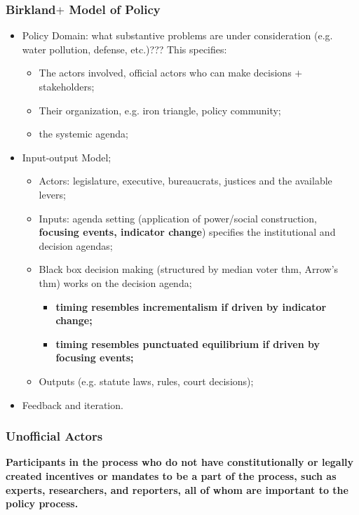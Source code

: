 \documentclass[aspectratio=169]{beamer}
\theoremstyle{principle}
\begin{document}
\begin{frame}
\frametitle{Birkland$+$ Model of Policy}
\begin{itemize}
\item Policy Domain: what substantive problems are under consideration (e.g. water pollution, defense, etc.)???  This specifies:
\begin{itemize}
\item The actors involved, official actors who can make decisions $+$ stakeholders; 
\item Their organization, e.g. iron triangle, policy community;
\item the systemic agenda; 
\end{itemize}
\bigskip
\item \color{black}Input-output Model;
\begin{itemize}
\item Actors: legislature, executive, bureaucrats, justices and the available levers;
\item Inputs: agenda setting (application of power/social construction, \textbf{focusing events, indicator change}) specifies the institutional and decision agendas;
\item Black box decision making (structured by median voter thm, Arrow's thm) works on the decision agenda;
\begin{itemize}
\item \textbf{timing resembles incrementalism if driven by indicator change;}
\item \textbf{timing resembles punctuated equilibrium if driven by focusing events;}
 \end{itemize}
\item Outputs (e.g. statute laws, rules, court decisions);
\end{itemize}
\bigskip
\item Feedback and iteration.
\end{itemize}
\end{frame}

\begin{frame}
\frametitle{Unofficial Actors}
\begin{center}
\Large \textbf{Participants in the process who do not have constitutionally or legally created incentives or mandates to be a part of the process, such as experts, researchers, and reporters, all of whom are important to the policy process.}
\end{center}
\end{frame}
\end{document}
